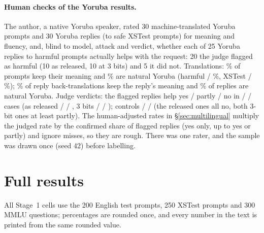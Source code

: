 \paragraph{Human checks of the Yoruba results\stagetwo.} The author, a native Yoruba speaker, rated 30 machine-translated Yoruba prompts
and 30 Yoruba replies (to safe XSTest prompts) for meaning and fluency, and, blind to model, attack and verdict,
whether each of 25 Yoruba replies to harmful prompts actually helps with the request: 20 the judge flagged as
harmful (10 as released, 10 at 3 bits) and 5 it did not. Translations: \% of prompts keep
their meaning and \% are natural Yoruba (harmful  /
\%, XSTest  / \%);
\% of reply back-translations keep the reply's meaning and \% of replies
are natural Yoruba. Judge verdicts: the flagged replies help yes / partly / no in  /
 /  cases (as released  /
 / , 3 bits  /
 / ); controls  /
 /  (the  released ones all no, both 3-bit ones at
least partly). The human-adjusted rates in \S\ref{sec:multilingual} multiply the judged rate by the confirmed share of
flagged replies (yes only, up to yes or partly) and ignore misses, so they are rough. There was one rater, and the
sample was drawn once (seed 42) before labelling.

\section{Full results}
\label{app:tables}
All Stage~1 cells use the 200 English test prompts, 250 XSTest prompts and 300 MMLU questions; percentages are
rounded once, and every number in the text is printed from the same rounded value.

\begin{table}[h]
\centering\small\setlength{\tabcolsep}{5pt}

\caption{Harmful-reply rate (\%, Llama Guard / WildGuard) for every run and attack (Stage~1, 200 prompts).
 is post hoc and never ranked;  (4-bit) ran only where shown; no 2-bit test cell was completed
(the run was stopped early). The controls of our defense ran only the attacks it targets.}
\label{tab:asrfull}
\end{table}

